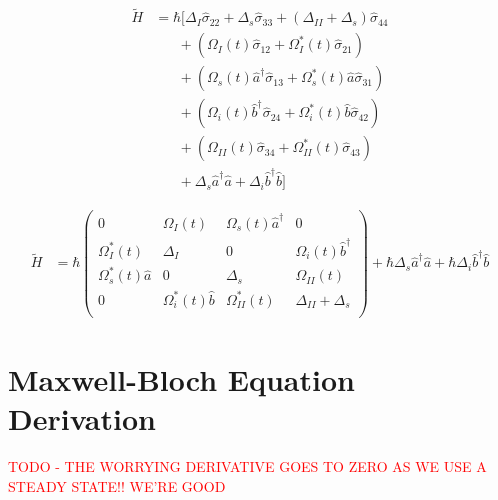 \documentclass[aps,pra,showpacs,amsmath,amssymb,nofootinbib,longbibliography,superscriptaddress
]{revtex4-1}
\theoremstyle{definition}
\theoremstyle{remark}
\newcommand{\0}{\hat{0}}
\begin{document}
\begin{align}
    \tilde{H}
    &=
    \hbar \biggl[
        \Delta_I \hat{\sigma}_{22} +
        \Delta_s \hat{\sigma}_{33} +
        (\Delta_{II} + \Delta_s) \hat{\sigma}_{44} \nonumber \\
        &\;\;\;\;\;\;+
        \left(
            \Omega_{I}(t) \hat{\sigma}_{12} +
            \Omega_{I}^*(t) \hat{\sigma}_{21}
        \right)\nonumber \\
        &\;\;\;\;\;\;+
        \left(
            \Omega_{s}(t) \hat{a}^{\dagger} \hat{\sigma}_{13} +
            \Omega_{s}^*(t) \hat{a} \hat{\sigma}_{31}
        \right) \nonumber \\
        &\;\;\;\;\;\;+
        \left(
            \Omega_{i}(t) \hat{b}^{\dagger} \hat{\sigma}_{24} +
            \Omega_{i}^*(t) \hat{b} \hat{\sigma}_{42}
        \right) \nonumber \\
        &\;\;\;\;\;\;+
        \left(
            \Omega_{II}(t) \hat{\sigma}_{34} +
            \Omega_{II}^*(t) \hat{\sigma}_{43}
        \right) \nonumber \\
        &\;\;\;\;\;\;+
        \Delta_s \hat{a}^{\dagger}\hat{a} +
        \Delta_i  \hat{b}^{\dagger}\hat{b}
    \biggr]
\end{align}

\begin{align}
    \tilde{H}
    &=
    \hbar \left(
        \begin{array}{cccc}
            0 & \Omega_{I}(t) & \Omega_{s}(t) \hat{a}^{\dagger} & 0\\
            \Omega_{I}^*(t) & \Delta_I & 0 & \Omega_{i}(t) \hat{b}^{\dagger}\\
            \Omega_{s}^*(t) \hat{a} & 0 & \Delta_s & \Omega_{II}(t)\\
            0 & \Omega_{i}^*(t) \hat{b} & \Omega_{II}^*(t) & \Delta_{II} + \Delta_s\\
        \end{array}
    \right) +
    \hbar \Delta_s \hat{a}^{\dagger}\hat{a} +
    \hbar \Delta_i  \hat{b}^{\dagger}\hat{b}
\end{align}


\section{Maxwell-Bloch Equation Derivation}

\textcolor{red}{TODO - THE WORRYING DERIVATIVE GOES TO ZERO AS WE USE A STEADY STATE!! WE'RE GOOD}
\end{document}

